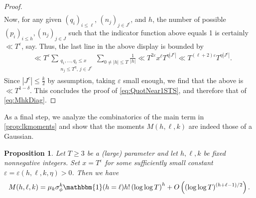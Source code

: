 \documentclass[12pt,oneside,english,a4paper]{amsart}
\newtheorem{prop}[thm]{Proposition}
\theoremstyle{remark}
\numberwithin{equation}{section}
\begin{document}
\begin{proof}
\begin{align*}
    \end{align*}
    Now, for any given $(q_i)_{i\leq \ell}$, $(n_j)_{j\in J^c}$, and $h$, the number of possible $(p_i)_{i\leq h},(n_j)_{j\in J}$ such that the indicator function above equals 1 is certainly $\ll T^{\varepsilon}$, say. Thus, the last line in the above display is bounded by
    \begin{align*}
        &\ll T^{\varepsilon} \sum_{\substack{q_1,\dots,q_\ell \leq x \\ n_j\leq T^\eta,\, j\in J^c}}  \sum_{0\neq |h| \leq T} \frac{1}{|h|}
        \ll T^{2\varepsilon}  x^{\ell} T^{\eta |J^c|} 
        \ll T^{(\ell + 2)\varepsilon} T^{\eta |J^c|}.
    \end{align*}
    Since $|J^c|\leq \frac k2$ by assumption, taking $\varepsilon$ small enough, we find that the above is $\ll T^{1-\delta}$. This concludes the proof of \eqref{eq:QuotNear1STS}, and therefore that of \eqref{eq:MhkDiag}.
\end{proof}

As a final step, we analyze the combinatorics of the main term in \cref{prop:lkmoments} and show that the moments $M(h,\ell,k)$ are indeed those of a Gaussian.

\begin{prop}\label{PropMomentPart2alt}
    Let $T \ge 3$ be a (large) parameter and let $h,\ell,k$ be fixed nonnegative integers. Set $x = T^{\varepsilon}$ for some sufficiently small constant $\varepsilon = \varepsilon(h,\ell,k,\eta) > 0$. Then we have
    \begin{equation}\begin{split}\label{MhkDiagEvalAlt}
     M(h,\ell, k) = \mu_k \sigma_\phi^k \mathbbm{1}(h = \ell) h! \left(\log\log T\right)^{h} + O \left( (\log\log T)^{(h + \ell -1)/2} \right).
    \end{split}\end{equation}
\end{prop}
\end{document}

